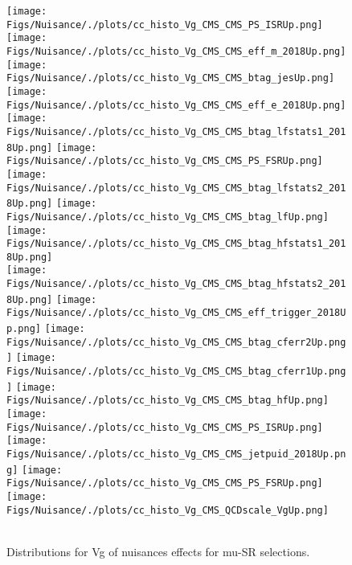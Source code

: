 \begin{figure*}[htbp]  
\centering 
\texttt{[image: Figs/Nuisance/./plots/cc\_histo\_Vg\_CMS\_CMS\_PS\_ISRUp.png]}
\texttt{[image: Figs/Nuisance/./plots/cc\_histo\_Vg\_CMS\_CMS\_eff\_m\_2018Up.png]}
\texttt{[image: Figs/Nuisance/./plots/cc\_histo\_Vg\_CMS\_CMS\_btag\_jesUp.png]}
\texttt{[image: Figs/Nuisance/./plots/cc\_histo\_Vg\_CMS\_CMS\_eff\_e\_2018Up.png]}
\texttt{[image: Figs/Nuisance/./plots/cc\_histo\_Vg\_CMS\_CMS\_btag\_lfstats1\_2018Up.png]}
\texttt{[image: Figs/Nuisance/./plots/cc\_histo\_Vg\_CMS\_CMS\_PS\_FSRUp.png]}
\texttt{[image: Figs/Nuisance/./plots/cc\_histo\_Vg\_CMS\_CMS\_btag\_lfstats2\_2018Up.png]}
\texttt{[image: Figs/Nuisance/./plots/cc\_histo\_Vg\_CMS\_CMS\_btag\_lfUp.png]}
\texttt{[image: Figs/Nuisance/./plots/cc\_histo\_Vg\_CMS\_CMS\_btag\_hfstats1\_2018Up.png]}\\
\texttt{[image: Figs/Nuisance/./plots/cc\_histo\_Vg\_CMS\_CMS\_btag\_hfstats2\_2018Up.png]}
\texttt{[image: Figs/Nuisance/./plots/cc\_histo\_Vg\_CMS\_CMS\_eff\_trigger\_2018Up.png]}
\texttt{[image: Figs/Nuisance/./plots/cc\_histo\_Vg\_CMS\_CMS\_btag\_cferr2Up.png]}
\texttt{[image: Figs/Nuisance/./plots/cc\_histo\_Vg\_CMS\_CMS\_btag\_cferr1Up.png]}
\texttt{[image: Figs/Nuisance/./plots/cc\_histo\_Vg\_CMS\_CMS\_btag\_hfUp.png]}
\texttt{[image: Figs/Nuisance/./plots/cc\_histo\_Vg\_CMS\_CMS\_PS\_ISRUp.png]}
\texttt{[image: Figs/Nuisance/./plots/cc\_histo\_Vg\_CMS\_CMS\_jetpuid\_2018Up.png]}
\texttt{[image: Figs/Nuisance/./plots/cc\_histo\_Vg\_CMS\_CMS\_PS\_FSRUp.png]}
\texttt{[image: Figs/Nuisance/./plots/cc\_histo\_Vg\_CMS\_QCDscale\_VgUp.png]}\\
\\ 
\caption{ 
   Distributions for Vg of nuisances effects for mu-SR selections.
} 
\label{fig:Vg_mu_SR} 
\end{figure*} 




